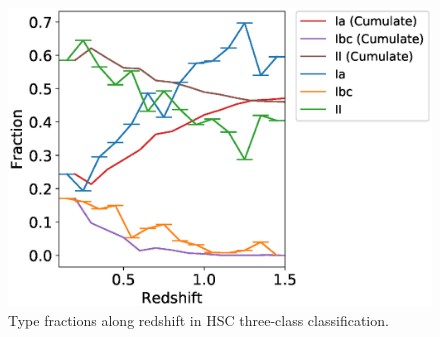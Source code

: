 \documentclass[useamsfonts]{pasj01}
\begin{document}
%
\begin{figure}[ht]
  \begin{center}
     \includegraphics[width=\columnwidth]{figures/SNfrac_alongz.eps}
  \end{center}
  \caption{%
  Type fractions along redshift in HSC three-class classification.
  }%
  \label{fig:misclass_rate_3class}
\end{figure}
%
%
%
%
\end{document}

